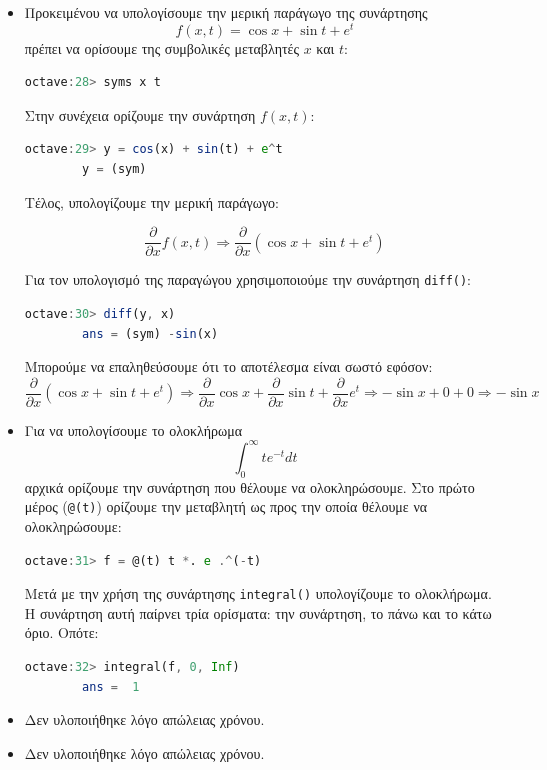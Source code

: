 \documentclass{article}
\begin{document}
\begin{itemize}
\item
Προκειμένου να υπολογίσουμε την μερική παράγωγο της συνάρτησης 
\[f(x, t) = \cos x + \sin t + e^t\]
πρέπει να ορίσουμε της συμβολικές μεταβλητές $x$ και $t$:
\begin{lstlisting}[language=octave]
        octave:28> syms x t
\end{lstlisting}

Στην συνέχεια ορίζουμε την συνάρτηση $f(x, t)$:
\begin{lstlisting}[language=octave]
        octave:29> y = cos(x) + sin(t) + e^t
        y = (sym)
\end{lstlisting}

Τέλος, υπολογίζουμε την μερική παράγωγο:

\[\frac{\partial}{\partial x}f(x, t) \Rightarrow
\frac{\partial}{\partial x}(\cos x + \sin t + e^t) \]

Για τον υπολογισμό της παραγώγου χρησιμοποιούμε την συνάρτηση
\lstinline{diff()}:
\begin{lstlisting}[language=octave]
        octave:30> diff(y, x)
        ans = (sym) -sin(x)
\end{lstlisting}

Μπορούμε να επαληθεύσουμε ότι το αποτέλεσμα είναι σωστό εφόσον:
\[\frac{\partial}{\partial x}(\cos x + \sin t + e^t) \Rightarrow
\frac{\partial}{\partial x} \cos x +
\frac{\partial}{\partial x} \sin t +
\frac{\partial}{\partial x} e^t \Rightarrow
-\sin x + 0 + 0 \Rightarrow -\sin x\]

\item
Για να υπολογίσουμε το ολοκλήρωμα
\[\int_{0}^{\infty} te^{-t}dt\]
αρχικά ορίζουμε την συνάρτηση που θέλουμε να ολοκληρώσουμε. Στο πρώτο
μέρος (\lstinline{@(t)}) ορίζουμε την μεταβλητή ως προς την οποία
θέλουμε να ολοκληρώσουμε:
\begin{lstlisting}[language=octave]
        octave:31> f = @(t) t *. e .^(-t)
\end{lstlisting}
Μετά με την χρήση της συνάρτησης \lstinline{integral()} υπολογίζουμε το
ολοκλήρωμα. Η συνάρτηση αυτή παίρνει τρία ορίσματα: την συνάρτηση, το πάνω
και το κάτω όριο. Οπότε:
\begin{lstlisting}[language=octave]
        octave:32> integral(f, 0, Inf)
        ans =  1
\end{lstlisting}

\item
Δεν υλοποιήθηκε λόγο απώλειας χρόνου.

\item
Δεν υλοποιήθηκε λόγο απώλειας χρόνου.


\end{itemize}
\end{document}
